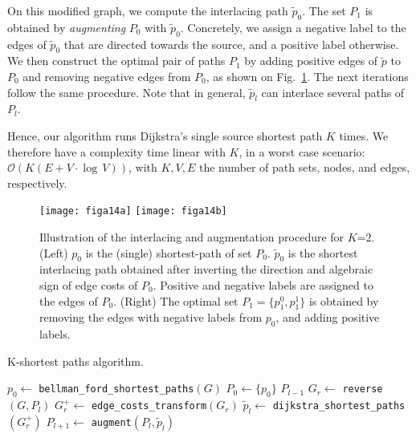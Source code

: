 On this modified graph, we compute the interlacing path $\tilde{p}_0$. The set $P_{1}$ is obtained by {\it augmenting} $P_0$ with $\tilde{p}_0$. Concretely, we assign a negative label to the edges of $\tilde{p}_0$ that are directed towards the source, and a positive label otherwise. We then construct the optimal pair of paths $P_{1}$ by adding positive edges of $\tilde{p}$ to $P_0$ and removing negative edges from $P_0$, as shown on Fig.~\ref{fig:augment}. The next iterations follow the same procedure. Note that in general, $\tilde{p}_l$ can interlace several paths of $P_l$.

Hence, our algorithm runs Dijkstra's single source shortest path $K$ times. We therefore have a complexity time linear with $K$, \ie in a worst case scenario: $\mathcal{O} \left( K(E + V \cdot \log \, V) \right)$, with $K, V, E$ the number of path sets, nodes, and edges, respectively.

\begin{figure}[t]
\centering
\texttt{[image: figa14a]}
\texttt{[image: figa14b]}
\caption{Illustration of the interlacing and augmentation procedure for $K$=2. (Left) $p_0$ is the (single) shortest-path of set $P_0$. $\tilde{p}_0$ is the shortest interlacing path obtained after inverting the direction and algebraic sign of edge costs of $P_0$. Positive and negative labels are assigned to the edges of $P_0$. (Right) The optimal set $P_1=\{ p_1^0,p_1^1 \}$ is obtained by removing the edges with negative labels from $p_0$, and adding positive labels.}\label{fig:augment}
\end{figure}


\begin{algorithm}[t]
\caption{K-shortest paths algorithm.\label{alg:ksp}}
\begin{algorithmic}[1]
\State $p_0 \gets$ \texttt{bellman\_ford\_shortest\_paths}$(G)$
\State $P_0 \gets\{p_0\} $
     \Return $P_{l-1}$
 \EndIf
 \EndIf
   \State $G_r \gets$ \texttt{reverse}$(G,P_l)$
   \State $G_r^+ \gets$ \texttt{edge\_costs\_transform}$(G_r)$
   \State $\tilde{p}_l \gets$ \texttt{dijkstra\_shortest\_paths}$(G_r^+)$
   \State $P_{l+1} \gets$ \texttt{augment}$(P_l, \tilde{p}_l)$
\EndFor

\end{algorithmic}
\end{algorithm}

